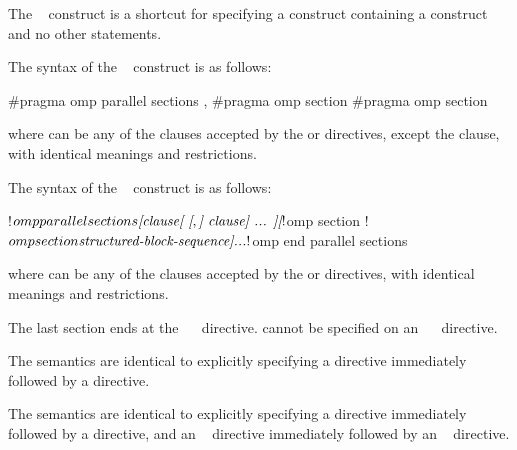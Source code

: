 \summary
The ~ construct is a shortcut for specifying a 
 construct containing a  construct and no other 
statements.

\syntax
\begin{ccppspecific}
The syntax of the ~ construct is as follows:

\begin{ompcPragma}
#pragma omp parallel sections \plc{[clause[ [},\plc{] clause] ... ] new-line}
    {
    \plc{[}#pragma omp section \plc{new-line]}
    \plc{[}#pragma omp section 
        \plc{structured-block-sequence]}
    }
\end{ompcPragma}

where  can be any of the clauses accepted by the  
or  directives, except the  clause, with identical 
meanings and restrictions.
\end{ccppspecific}

\begin{fortranspecific}
The syntax of the ~ construct is as follows:

\begin{ompfPragma}
!$omp parallel sections \plc{[clause[ [},\plc{] clause] ... ]}
    \plc{[}!$omp section\plc{]}
    \plc{[}!$omp section
        \plc{structured-block-sequence]}
    \plc{...}
!$omp end parallel sections
\end{ompfPragma}

where  can be any of the clauses accepted by the  
or  directives, with identical meanings and restrictions.

The last section ends at the ~~ directive. 
 cannot be specified on an ~~ 
directive.
\end{fortranspecific}

\descr
\begin{ccppspecific}
The semantics are identical to explicitly specifying a  directive 
immediately followed by a  directive.
\end{ccppspecific}

\begin{fortranspecific}
The semantics are identical to explicitly specifying a  directive 
immediately followed by a  directive, and an ~
directive immediately followed by an ~ directive.
\end{fortranspecific}

